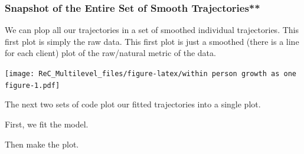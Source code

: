 \documentclass[
  english,
]{book}
\newenvironment{Shaded}{\begin{snugshade}}{\end{snugshade}}
\newcommand{\AttributeTok}[1]{\textcolor[rgb]{0.77,0.63,0.00}{#1}}
\newcommand{\CommentTok}[1]{\textcolor[rgb]{0.56,0.35,0.01}{\textit{#1}}}
\newcommand{\ControlFlowTok}[1]{\textcolor[rgb]{0.13,0.29,0.53}{\textbf{#1}}}
\newcommand{\FunctionTok}[1]{\textcolor[rgb]{0.00,0.00,0.00}{#1}}
\newcommand{\NormalTok}[1]{#1}
\newcommand{\OtherTok}[1]{\textcolor[rgb]{0.56,0.35,0.01}{#1}}
\newcommand{\SpecialCharTok}[1]{\textcolor[rgb]{0.00,0.00,0.00}{#1}}
\newcommand{\StringTok}[1]{\textcolor[rgb]{0.31,0.60,0.02}{#1}}
\begin{document}
\hypertarget{snapshot-of-the-entire-set-of-smooth-trajectories}{%
\subsubsection{Snapshot of the Entire Set of Smooth Trajectories**}\label{snapshot-of-the-entire-set-of-smooth-trajectories}}

We can plop all our trajectories in a set of smoothed individual trajectories. This first plot is simply the raw data. This first plot is just a smoothed (there is a line for each client) plot of the raw/natural metric of the data.

\begin{Shaded}
\end{Shaded}

\texttt{[image: ReC\_Multilevel\_files/figure-latex/within person growth as one figure-1.pdf]}

The next two sets of code plot our fitted trajectories into a single plot.

First, we fit the model.

\begin{Shaded}
\end{Shaded}

Then make the plot.

\begin{Shaded}
\end{Shaded}
\end{document}
